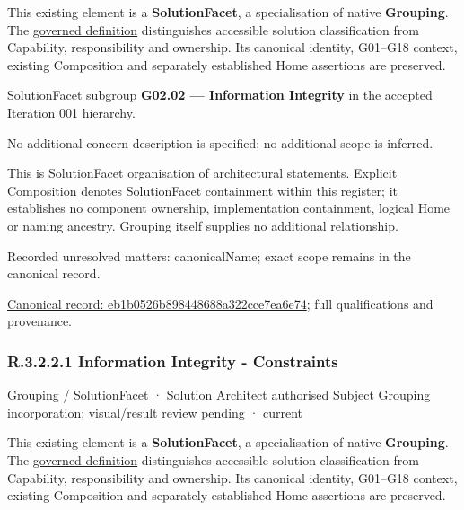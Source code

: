 This existing element is a \textbf{SolutionFacet}, a specialisation of native
\textbf{Grouping}. The \href{\detokenize{../../../../../../../governance/continuum-representation.md#solutionfacet-classification--1119-candidate}}{governed definition}
distinguishes accessible solution classification from Capability, responsibility
and ownership. Its canonical identity, G01–G18 context, existing Composition
and separately established Home assertions are preserved.



SolutionFacet subgroup \textbf{G02.02 — Information Integrity} in the accepted Iteration 001 hierarchy.



No additional concern description is specified; no additional scope is inferred.



This is SolutionFacet organisation of architectural statements. Explicit Composition denotes SolutionFacet containment within this register; it establishes no component ownership, implementation containment, logical Home or naming ancestry. Grouping itself supplies no additional relationship.


{\small Recorded unresolved matters: canonicalName; exact scope remains in the canonical record.}\par
{\footnotesize \href{../../../../../../../continuum/grouping/eb1b0526b898448688a322cce7ea6e74.md}{Canonical record: eb1b0526b898448688a322cce7ea6e74}; full qualifications and provenance.}\par
\subsubsection*{R.3.2.2.1 Information Integrity - Constraints}
\label{navigation:R.3.2.2.1}

\label{element:80aa94b4210047a0a14563f408da1694}
{\small Grouping / SolutionFacet · Solution Architect authorised Subject Grouping incorporation; visual/result review pending · current}\par

This existing element is a \textbf{SolutionFacet}, a specialisation of native
\textbf{Grouping}. The \href{\detokenize{../../../../../../../governance/continuum-representation.md#solutionfacet-classification--1119-candidate}}{governed definition}
distinguishes accessible solution classification from Capability, responsibility
and ownership. Its canonical identity, G01–G18 context, existing Composition
and separately established Home assertions are preserved.



